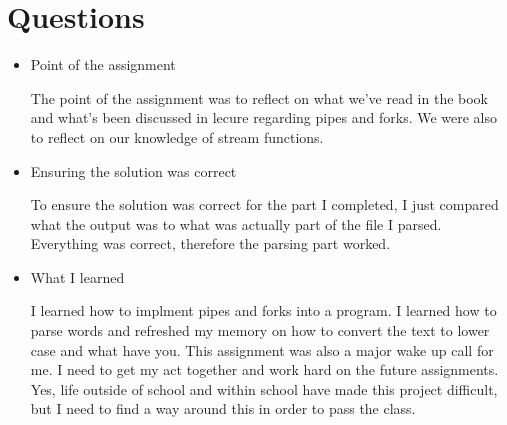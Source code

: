 \documentclass[12pt]{article}
\begin{document}
\section{Questions}

\begin{itemize}
\item Point of the assignment

The point of the assignment was to reflect on what we've read in the book and what's been discussed in lecure regarding pipes and forks. We were also to reflect on our knowledge of stream functions. 

\item Ensuring the solution was correct

To ensure the solution was correct for the part I completed, I just compared what the output was to what was actually part of the file I parsed. Everything was correct, therefore the parsing part worked. 

\item What I learned

I learned how to implment pipes and forks into a program. I learned how to parse words and refreshed my memory on how to convert the text to lower case and what have you. This assignment was also a major wake up call for me. I need to get my act together and work hard on the future assignments. Yes, life outside of school and within school have made this project difficult, but I need to find a way around this in order to pass the class. 
\end{itemize}
\end{document}
